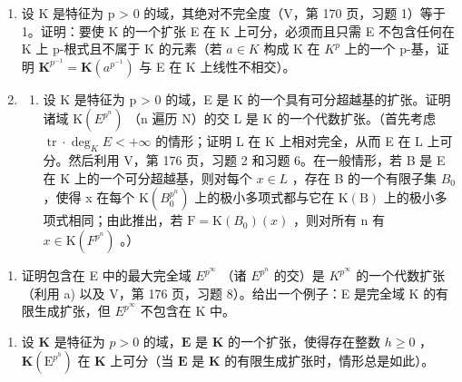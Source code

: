 \begin{enumerate}
\def\labelenumi{\arabic{enumi})}
\setcounter{enumi}{3}
\item
  设 K 是特征为 p \textgreater{} 0 的域，其绝对不完全度（V，第 170 页，习题 1）等于 1。证明：要使 K 的一个扩张 E 在 K 上可分，必须而且只需 E 不包含任何在 K 上 p-根式且不属于 K 的元素（若 \(a \in K\) 构成 K 在 \(K^{p}\) 上的一个 p-基，证明 \(\mathbf{K}^{p^{-1}} = \mathbf{K}(a^{p^{-1}})\) 与 E 在 K 上线性不相交）。
\item
  \begin{enumerate}
  \def\labelenumii{\alph{enumii})}
  \tightlist
  \item
    设 K 是特征为 p \textgreater{} 0 的域，E 是 K 的一个具有可分超越基的扩张。证明诸域 \(\mathrm{K}(E^{p^{n}})\) （n 遍历 N）的交 L 是 K 的一个代数扩张。（首先考虑 \(\operatorname{tr} \cdot \deg_{K} E < +\infty\) 的情形；证明 L 在 K 上相对完全，从而 E 在 L 上可分。然后利用 V，第 176 页，习题 2 和习题 6。在一般情形，若 B 是 E 在 K 上的一个可分超越基，则对每个 \(x \in L\) ，存在 B 的一个有限子集 \(B_{0}\) ，使得 x 在每个 \(\mathrm{K}(B_{0}^{p^{n}})\) 上的极小多项式都与它在 \(\mathrm{K(B)}\) 上的极小多项式相同；由此推出，若 \(\mathrm{F} = \mathrm{K}(B_{0})(x)\) ，则对所有 n 有 \(x \in \mathrm{K}(F^{p^{n}})\) 。）
  \end{enumerate}
\end{enumerate}

\begin{enumerate}
\def\labelenumi{\alph{enumi})}
\setcounter{enumi}{1}
\tightlist
\item
  证明包含在 E 中的最大完全域 \(E^{p^{\infty}}\) （诸 \(E^{p^{n}}\) 的交）是 \(K^{p^{\infty}}\) 的一个代数扩张（利用 a) 以及 V，第 176 页，习题 8）。给出一个例子：E 是完全域 K 的有限生成扩张，但 \(E^{p^{\infty}}\) 不包含在 K 中。
\end{enumerate}

\begin{enumerate}
\def\labelenumi{\arabic{enumi})}
\setcounter{enumi}{5}
\tightlist
\item
  设 \(\mathbf{K}\) 是特征为 \(p > 0\) 的域，\(\mathbf{E}\) 是 \(\mathbf{K}\) 的一个扩张，使得存在整数 \(h \geqslant 0\) ，\(\mathbf{K}(\mathrm{E}^{p^h})\) 在 \(\mathbf{K}\) 上可分（当 \(\mathbf{E}\) 是 \(\mathbf{K}\) 的有限生成扩张时，情形总是如此）。
\end{enumerate}

